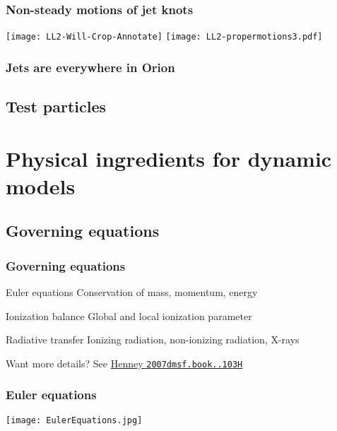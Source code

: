 \documentclass[presentation]{beamer}
\begin{document}
\begin{frame}
  \frametitle{Non-steady motions of jet knots}
  \hfill
  \texttt{[image: LL2-Will-Crop-Annotate]}
  \hfill
  \texttt{[image: LL2-propermotions3.pdf]}
  \hfill\null
\end{frame}

\begin{frame}
  \frametitle{Jets are everywhere in Orion}
\end{frame}


\subsection{Test particles}




\section{Physical ingredients for dynamic models}

\subsection{Governing equations}
\begin{frame}
  \frametitle{Governing equations}
  \begin{block}{Euler equations}
    Conservation of mass, \alert{momentum}, energy
  \end{block}
  \begin{block}{Ionization balance}
    Global and local ionization parameter
  \end{block}
  \begin{block}{Radiative transfer}
    \alert{Ionizing radiation}, non-ionizing radiation, X-rays
  \end{block}
  \begin{block}{Want more details?}
    See \href{http://adsabs.harvard.edu/abs/2007dmsf.book..103H}{Henney \texttt{2007dmsf.book..103H}}
  \end{block}
\end{frame}



\begin{frame}
  \frametitle{Euler equations}
  \begin{centering}
    \texttt{[image: EulerEquations.jpg]}\par
  \note{
    \[
    \frac{d}{dt} ( \rho \VEC{u} ) + \VEC{\grad} ( P + \rho u^2 ) = \rho \VEC{a} 
    \]
  }
  \end{centering}
\end{frame}
\end{document}
